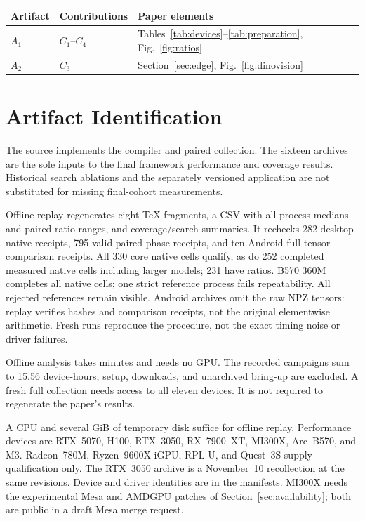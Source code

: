 \begin{center}
\begin{tabular}{lll}
\toprule
Artifact & Contributions & Paper elements\\
\midrule
$A_1$ & $C_1$--$C_4$ & Tables~\ref{tab:devices}--\ref{tab:preparation}, Fig.~\ref{fig:ratios}\\
$A_2$ & $C_3$ & Section~\ref{sec:edge}, Fig.~\ref{fig:dinovision}\\
\bottomrule
\end{tabular}
\end{center}

\section{Artifact Identification}
\newartifact
\artrel
The source implements the compiler and paired collection. The sixteen
archives are the sole inputs to the final framework performance and coverage
results. Historical search ablations and the separately versioned application
are not substituted for missing final-cohort measurements.

\artexp
Offline replay regenerates eight TeX fragments, a CSV with all process medians
and paired-ratio ranges, and coverage/search summaries. It rechecks 282
desktop native receipts, 795 valid paired-phase receipts, and ten Android
full-tensor comparison receipts. All 330 core native cells qualify, as do
252 completed measured native cells including larger models; 231 have ratios.
B570 360M completes all native cells; one strict reference process fails
repeatability. All rejected references remain visible.
Android archives omit the raw NPZ tensors: replay verifies hashes and
comparison receipts, not the original elementwise arithmetic. Fresh runs
reproduce the procedure, not the exact timing noise or driver failures.

\arttime
Offline analysis takes minutes and needs no GPU. The recorded campaigns sum
to 15.56 device-hours; setup, downloads, and unarchived bring-up are excluded.
A fresh full collection needs access to all eleven devices. It is not
required to regenerate the paper's results.

\artin
{}
A CPU and several GiB of temporary disk suffice for offline replay.
Performance devices are RTX~5070, H100, RTX~3050, RX~7900~XT, MI300X,
Arc~B570, and M3. Radeon~780M, Ryzen~9600X iGPU, RPL-U, and Quest~3S
supply qualification only. The RTX~3050 archive is a November~10 recollection
at the same revisions. Device and driver identities are in the manifests.
MI300X needs the experimental Mesa and AMDGPU patches of
Section~\ref{sec:availability}; both are public in a draft Mesa merge request.

